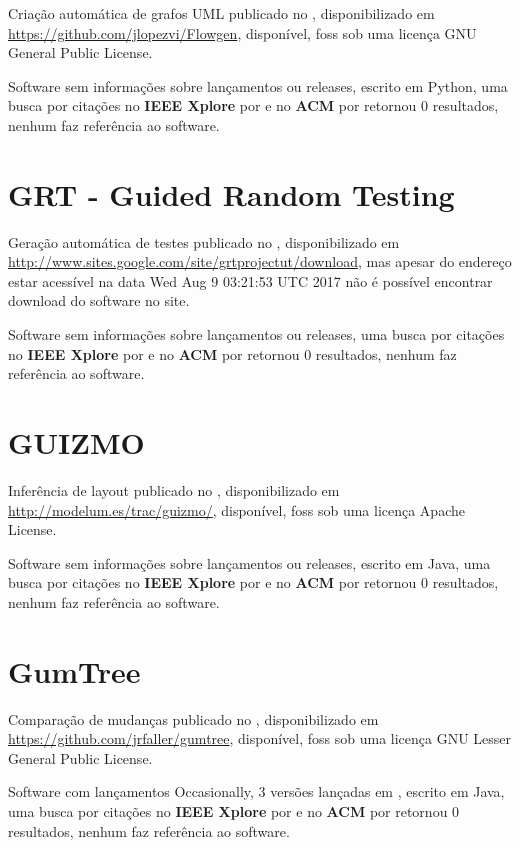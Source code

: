 Criação automática de grafos UML
publicado no  ,
disponibilizado em \url{https://github.com/jlopezvi/Flowgen},
disponível,
foss
sob uma licença GNU General Public License.

Software sem informações sobre lançamentos ou releases,
escrito em Python,
uma busca por citações no {\bf IEEE Xplore} por
\texttt{}
e no {\bf ACM} por
\texttt{}
retornou
0 resultados,
nenhum faz referência ao software.



\section{GRT - Guided Random Testing}

Geração automática de testes
publicado no  ,
disponibilizado em \url{http://www.sites.google.com/site/grtprojectut/download},
mas apesar do endereço estar acessível na data 
Wed Aug  9 03:21:53 UTC 2017
não é possível encontrar download do software no site.

Software sem informações sobre lançamentos ou releases,
uma busca por citações no {\bf IEEE Xplore} por
\texttt{}
e no {\bf ACM} por
\texttt{}
retornou
0 resultados,
nenhum faz referência ao software.



\section{GUIZMO}

Inferência de layout
publicado no  ,
disponibilizado em \url{http://modelum.es/trac/guizmo/},
disponível,
foss
sob uma licença Apache License.

Software sem informações sobre lançamentos ou releases,
escrito em Java,
uma busca por citações no {\bf IEEE Xplore} por
\texttt{}
e no {\bf ACM} por
\texttt{}
retornou
0 resultados,
nenhum faz referência ao software.



\section{GumTree}

Comparação de mudanças
publicado no  ,
disponibilizado em \url{https://github.com/jrfaller/gumtree},
disponível,
foss
sob uma licença GNU Lesser General Public License.

Software com lançamentos Occasionally,
3 versões lançadas
em ,
escrito em Java,
uma busca por citações no {\bf IEEE Xplore} por
\texttt{}
e no {\bf ACM} por
\texttt{}
retornou
0 resultados,
nenhum faz referência ao software.



